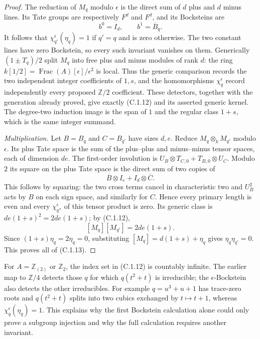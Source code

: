 \begin{proof}
The reduction of $M_q$ modulo $\epsilon$ is the direct sum of
$d$ plus and $d$ minus lines. Its Tate groups are respectively
$F^d$ and $F^d$, and its Bocksteins are
\[
 b^0=I_d,\qquad b^1=\overline B_q.
\]
It follows that
$\chi_{q'}^\epsilon(\eta_q)=1$ if $q'=q$ and is zero otherwise.
The two constant lines have zero Bockstein, so every such
invariant vanishes on them. Generically $(1\pm T_q)/2$ split
$M_q$ into free plus and minus modules of rank $d$: the ring
$k[1/2]=\operatorname{Frac}(A)[\epsilon]/\epsilon^2$ is local.
Thus the generic comparison records the two independent integer
coefficients of $1,s$, and the homomorphisms
$\chi_q^\epsilon$ record independently every proposed
$\mathbb Z/2$ coefficient. These detectors, together with the
generation already proved, give exactly (C.1.12) and its asserted
generic kernel. The degree-two induction image is the span of
$1$ and the regular class $1+s$, which is the same integer
summand.

\emph{Multiplication.}
Let $B=B_q$ and $C=B_{q'}$ have sizes $d,e$. Reduce
$M_q\otimes_k M_{q'}$ modulo $\epsilon$. Its plus Tate space
is the sum of the plus--plus and minus--minus tensor spaces,
each of dimension $de$. The first-order involution is
$U_B\otimes T_{C,0}+T_{B,0}\otimes U_C$. Modulo $2$ its square
on the plus Tate space is the direct sum of two copies of
\[
 \overline B\otimes I_e+I_d\otimes\overline C.          \tag{C.1.16}
\]
This follows by squaring: the two cross terms cancel in
characteristic two and $U_B^2$ acts by $B$ on each sign space,
and similarly for $C$. Hence every primary length is even and
every $\chi_{q''}^\epsilon$ of this tensor product is zero.
Its generic class is $de(1+s)^2=2de(1+s)$; by (C.1.12),
\[
 [M_q][M_{q'}]=2de(1+s).
\]
Since $(1+s)\eta_q=2\eta_q=0$, substituting
$[M_q]=d(1+s)+\eta_q$ gives $\eta_q\eta_{q'}=0$.
This proves all of (C.1.13).
\end{proof}

For $A=\mathbb Z_{(2)}$ or $\mathbb Z_2$, the index set in
(C.1.12) is countably infinite. The earlier map to $\mathbb Z/4$
detects those $q$ for which $q(t^2+t)$ is irreducible; the
$\epsilon$-Bockstein also detects the other irreducibles.
For example $q=u^3+u+1$ has trace-zero roots and
$q(t^2+t)$ splits into two cubics exchanged by $t\mapsto t+1$,
whereas $\chi_q^\epsilon(\eta_q)=1$. This explains why the
first Bockstein calculation alone could only prove a subgroup
injection and why the full calculation requires another invariant.

